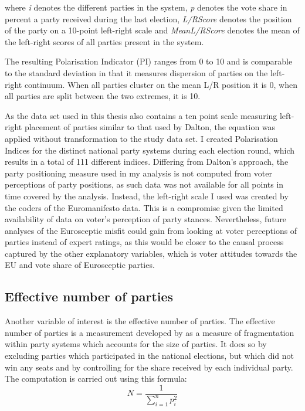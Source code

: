 where \emph{i} denotes the different parties in the system, \emph{p} denotes the vote share in percent a party received during the last election, \emph{L/RScore} denotes the position of the party on a 10-point left-right scale and \emph{MeanL/RScore} denotes the mean of the left-right scores of all parties present in the system.  

The resulting Polarisation Indicator (PI) ranges from 0 to 10 and is comparable to the standard deviation in that it measures dispersion of parties on the left-right continuum. When all parties cluster on the mean L/R position it is 0, when all parties are split between the two extremes, it is 10. 

As the data set used in this thesis also contains a ten point scale measuring left-right placement of parties similar to that used by Dalton, the equation was applied without transformation to the study data set. I created Polarisation Indices for the distinct national party systems during each election round, which results in a total of 111 different indices. Differing from Dalton's approach, the party positioning measure used in my analysis is not computed from voter perceptions of party positions, as such data was not available for all points in time covered by the analysis. Instead, the left-right scale I used was created by the coders of the Euromanifesto data. This is a compromise given the limited availability of data on voter's perception of party stances. Nevertheless, future analyses of the Eurosceptic misfit could gain from looking at voter perceptions of parties instead of expert ratings, as this would be closer to the causal process captured by the other explanatory variables, which is voter attitudes towards the EU and vote share of Eurosceptic parties.

\subsection{Effective number of parties}
Another variable of interest is the effective number of parties. The effective number of parties is a measurement developed by  as a measure of fragmentation within party systems which accounts for the size of parties. It does so by excluding parties which participated in the national elections, but which did not win any seats and by controlling for the share received by each individual party. The computation is carried out using this formula:
\begin{equation}
 N = \frac{1}{\sum_{i=1}^n p_i^2}
\end{equation}


